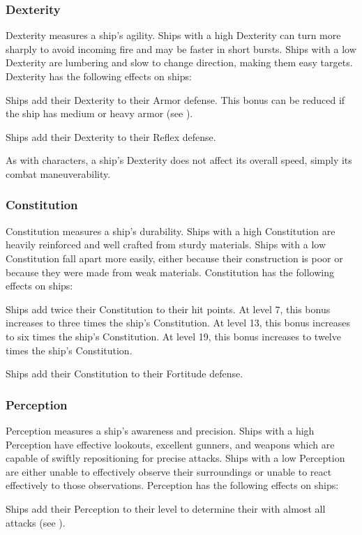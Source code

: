     \subsubsection{Dexterity}
      Dexterity measures a ship's agility.
      Ships with a high Dexterity can turn more sharply to avoid incoming fire and may be faster in short bursts.
      Ships with a low Dexterity are lumbering and slow to change direction, making them easy targets.
      Dexterity has the following effects on ships:
      \begin{raggeditemize}
        \item Ships add their Dexterity to their Armor defense.
          This bonus can be reduced if the ship has medium or heavy armor (see ).
        \item Ships add their Dexterity to their Reflex defense.
      \end{raggeditemize}

      As with characters, a ship's Dexterity does not affect its overall speed, simply its combat maneuverability.

    \subsubsection{Constitution}
      Constitution measures a ship's durability.
      Ships with a high Constitution are heavily reinforced and well crafted from sturdy materials.
      Ships with a low Constitution fall apart more easily, either because their construction is poor or because they were made from weak materials.
      Constitution has the following effects on ships:
      \begin{raggeditemize}
        \item Ships add twice their Constitution to their hit points.
          At level 7, this bonus increases to three times the ship's Constitution.
          At level 13, this bonus increases to six times the ship's Constitution.
          At level 19, this bonus increases to twelve times the ship's Constitution.
        \item Ships add their Constitution to their Fortitude defense.
      \end{raggeditemize}

    \subsubsection{Perception}
      Perception measures a ship's awareness and precision.
      Ships with a high Perception have effective lookouts, excellent gunners, and weapons which are capable of swiftly repositioning for precise attacks.
      Ships with a low Perception are either unable to effectively observe their surroundings or unable to react effectively to those observations.
      Perception has the following effects on ships:
      \begin{raggeditemize}
        \item Ships add their Perception to their level to determine their  with almost all attacks (see ).
      \end{raggeditemize}

